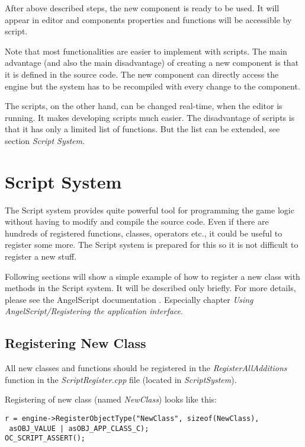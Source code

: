 \documentclass[a4paper, 12pt]{report}
\begin{document}
After above described steps, the new component is ready to be used. It will appear in editor and components properties and functions will be accessible by script.

Note that most functionalities are easier to implement with scripts. The main advantage (and also the main disadvantage) of creating a new component is that it is defined in the source code. The new component can directly access the engine but the system has to be recompiled with every change to the component. 

The scripts, on the other hand, can be changed real-time, when the editor is running. It makes developing scripts much easier. The disadvantage of scripts is that it has only a limited list of functions. But the list can be extended, see section \emph{Script System}.

\chapter{Script System}

The Script system provides quite powerful tool for programming the game logic without having to modify and compile the source code. Even if there are hundreds of registered functions, classes, operators etc., it could be useful to register some more. The Script system is prepared for this so it is not difficult to register a new stuff.

Following sections will show a simple example of how to register a new class with methods in the Script system. It will be described only briefly. For more details, please see the AngelScript documentation \cite{angelscript}. Especially chapter \emph{Using AngelScript/Registering the application interface}.

\section{Registering New Class}

All new classes and functions should be registered in the \emph{RegisterAllAdditions} function in the \emph{ScriptRegister.cpp} file (located in \emph{ScriptSystem}).

Registering of new class (named \emph{NewClass}) looks like this:

\footnotesize 
\begin{verbatim}
r = engine->RegisterObjectType("NewClass", sizeof(NewClass),
 asOBJ_VALUE | asOBJ_APP_CLASS_C);
OC_SCRIPT_ASSERT();
\end{verbatim}
\normalsize
\end{document}
